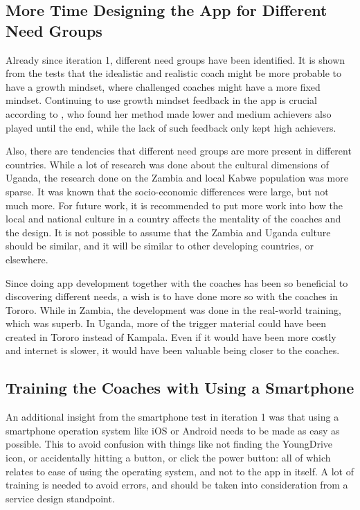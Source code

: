 \subsection{More Time Designing the App for Different Need Groups}
Already since iteration 1, different need groups have been identified. It is shown from the tests that the idealistic and realistic coach might be more probable to have a growth mindset, where challenged coaches might have a more fixed mindset. Continuing to use growth mindset feedback in the app is crucial according to \cite{dweck}, who found her method made lower and medium achievers also played until the end, while the lack of such feedback only kept high achievers.

Also, there are tendencies that different need groups are more present in different countries. While a lot of research was done about the cultural dimensions of Uganda, the research done on the Zambia and local Kabwe population was more sparse. It was known that the socio-economic differences were large, but not much more. For future work, it is recommended to put more work into how the local and national culture in a country affects the mentality of the coaches and the design. It is not possible to assume that the Zambia and Uganda culture should be similar, and it will be similar to other developing countries, or elsewhere.

Since doing app development together with the coaches has been so beneficial to discovering different needs, a wish is to have done more so with the coaches in Tororo. While in Zambia, the development was done in the real-world training, which was superb. In Uganda, more of the trigger material could have been created in Tororo instead of Kampala. Even if it would have been more costly and internet is slower, it would have been valuable being closer to the coaches.

\subsection{Training the Coaches with Using a Smartphone}
An additional insight from the smartphone test in iteration 1 was that using a smartphone operation system like iOS or Android needs to be made as easy as possible. This to avoid confusion with things like not finding the YoungDrive icon, or accidentally hitting a button, or click the power button: all of which relates to ease of using the operating system, and not to the app in itself. A lot of training is needed to avoid errors,  and should be taken into consideration from a service design standpoint.

